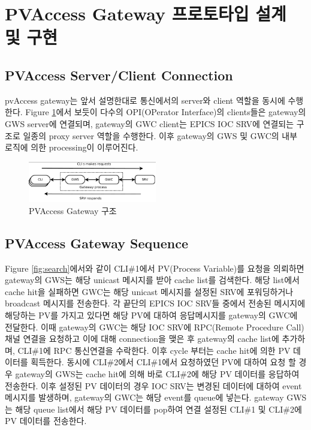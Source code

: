 \documentclass[11pt
  , a4paper
  , article
  , oneside
]{memoir}
\begin{document}
\section{PVAccess Gateway 프로토타입 설계 및 구현}
\subsection{PVAccess Server/Client Connection}
pvAccess gateway는 앞서 설명한대로 통신에서의 server와 client 역할을 동시에 수행한다. Figure \ref{fig:connections}에서 보듯이 다수의 OPI(OPerator Interface)의 clients들은 gateway의 GWS server에 연결되며, gateway의 GWC client는 EPICS IOC SRV에 연결되는 구조로 일종의 proxy server 역할을 수행한다. 이후 gateway의 GWS 및 GWC의 내부 로직에 의한 processing이 이루어진다. 

\begin{figure}[!htb]
	\centering
	\includegraphics[width=0.5\textwidth, height=0.2\textheight]{./images/connections.png}
	\caption{
		PVAccess Gateway 구조
	}
	\label{fig:connections}   
\end{figure}

\subsection{PVAccess Gateway Sequence}
Figure \ref{fig:search}에서와 같이 CLI\#1에서 PV(Process Variable)를 요청을 의뢰하면 gateway의 GWS는 해당 unicast 메시지를 받아 cache list를 검색한다. 해당 list에서 cache hit을 실패하면 GWC는 해당 unicast 메시지를 설정된 SRV에 포워딩하거나 broadcast 메시지를 전송한다. 각 끝단의 EPICS IOC SRV들 중에서 전송된 메시지에 해당하는 PV를 가지고 있다면 해당 PV에 대하여 응답메시지를 gateway의 GWC에 전달한다. 이때 gateway의 GWC는 해당 IOC SRV에 RPC(Remote Procedure Call) 채널 연결을 요청하고 이에 대해 connection을 맺은 후 gateway의 cache list에 추가하며, CLI\#1에 RPC 통신연결을 수락한다. 이후 cycle 부터는 cache hit에 의한 PV 데이터를 획득한다. 동시에 CLI\#2에서 CLI\#1에서 요청하였던 PV에 대하여 요청 할 경우 gateway의 GWS는 cache hit에 의해 바로 CLI\#2에 해당 PV 데이터를 응답하여 전송한다. 이후 설정된 PV 데이터의 경우 IOC SRV는 변경된 데이터에 대하여 event메시지를 발생하며, gateway의 GWC는 해당 event를 queue에 넣는다. gateway GWS는 해당 queue list에서 해당 PV 데이터를 pop하여 연결 설정된 CLI\#1 및 CLI\#2에 PV 데이터를 전송한다. 
\end{document}
